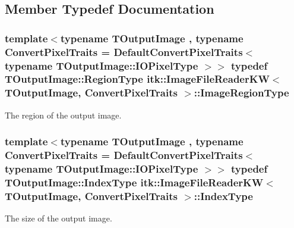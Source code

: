 \subsection{Member Typedef Documentation}
\subsubsection[{\texorpdfstring{Image\+Region\+Type}{ImageRegionType}}]{\setlength{\rightskip}{0pt plus 5cm}template$<$typename T\+Output\+Image , typename Convert\+Pixel\+Traits  = Default\+Convert\+Pixel\+Traits$<$                    typename T\+Output\+Image\+::\+I\+O\+Pixel\+Type $>$$>$ typedef T\+Output\+Image\+::\+Region\+Type {\bf itk\+::\+Image\+File\+Reader\+KW}$<$ T\+Output\+Image, Convert\+Pixel\+Traits $>$\+::{\bf Image\+Region\+Type}}\hypertarget{classitk_1_1_image_file_reader_k_w_aeb29601addf7afcf200728eafc93dccd}{}\label{classitk_1_1_image_file_reader_k_w_aeb29601addf7afcf200728eafc93dccd}
The region of the output image. 
\subsubsection[{\texorpdfstring{Index\+Type}{IndexType}}]{\setlength{\rightskip}{0pt plus 5cm}template$<$typename T\+Output\+Image , typename Convert\+Pixel\+Traits  = Default\+Convert\+Pixel\+Traits$<$                    typename T\+Output\+Image\+::\+I\+O\+Pixel\+Type $>$$>$ typedef T\+Output\+Image\+::\+Index\+Type {\bf itk\+::\+Image\+File\+Reader\+KW}$<$ T\+Output\+Image, Convert\+Pixel\+Traits $>$\+::{\bf Index\+Type}}\hypertarget{classitk_1_1_image_file_reader_k_w_a9daa1ecf6fe0192e6ea86f9bf9785912}{}\label{classitk_1_1_image_file_reader_k_w_a9daa1ecf6fe0192e6ea86f9bf9785912}
The size of the output image. 
